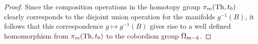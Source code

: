 \documentclass[../main]{subfiles}
\begin{document}
\begin{proof}
Since the composition operations in the homotopy group $\pi_m(\operatorname{Th}, t_0)$ clearly corresponds to the disjoint union operation for the manifolds $g^{-1}(B)$, it follows that this correspondence $g \mapsto g^{-1}(B)$ gives rise to a well defined homomorphism from $\pi_m(\operatorname{Th}, t_0)$ to the cobordism group $\Omega_{m - k}$. 
\end{proof}
\end{document}
